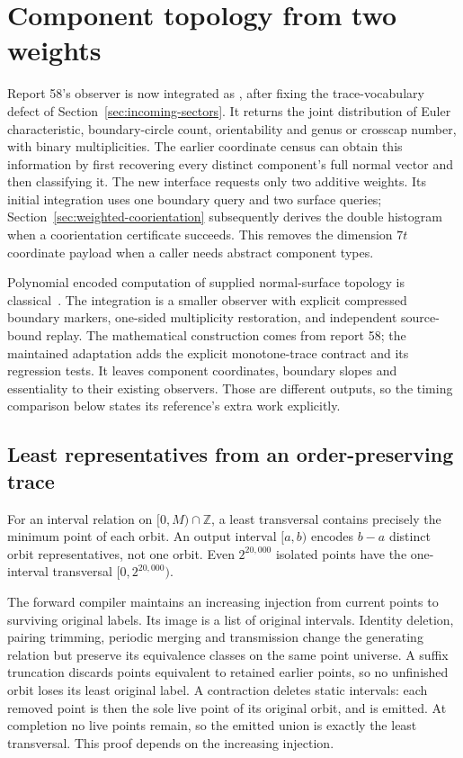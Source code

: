 \section{Component topology from two weights}
\label{sec:topology-spectra-native}

Report 58's observer is now integrated as
, after fixing the trace-vocabulary defect
of Section~\ref{sec:incoming-sectors}. It returns the joint distribution of
Euler characteristic, boundary-circle count, orientability and genus or
crosscap number, with binary multiplicities. The earlier coordinate census
can obtain this information by first recovering every distinct component's
full normal vector and then classifying it. The new interface requests only
two additive weights. Its initial integration uses one boundary query and
two surface queries; Section~\ref{sec:weighted-coorientation} subsequently
derives the double histogram when a coorientation certificate succeeds.
This removes the dimension $7t$ coordinate payload when a caller needs
abstract component types.

Polynomial encoded computation of supplied normal-surface topology is
classical~\cite{aht-orbits}. The integration is a smaller observer with
explicit compressed boundary markers, one-sided multiplicity restoration,
and independent source-bound replay. The mathematical construction comes
from report 58; the maintained adaptation adds the explicit monotone-trace
contract and its regression tests. It leaves component coordinates,
boundary slopes and essentiality to their existing observers. Those are
different outputs, so the timing comparison below states its reference's
extra work explicitly.

\subsection{Least representatives from an order-preserving trace}

For an interval relation on $[0,M)\cap\mathbb Z$, a least transversal
contains precisely the minimum point of each orbit. An output interval
$[a,b)$ encodes $b-a$ distinct orbit representatives, not one orbit.
Even $2^{20{,}000}$ isolated points have the one-interval transversal
$[0,2^{20{,}000})$.

The forward compiler maintains an increasing injection from current points
to surviving original labels. Its image is a list of original intervals.
Identity deletion, pairing trimming, periodic merging and transmission
change the generating relation but preserve its equivalence classes on
the same point universe. A suffix truncation discards points equivalent
to retained earlier points, so no unfinished orbit loses its least original
label. A contraction deletes static intervals: each removed point is then
the sole live point of its original orbit, and is emitted. At completion
no live points remain, so the emitted union is exactly the least transversal.
This proof depends on the increasing injection.

